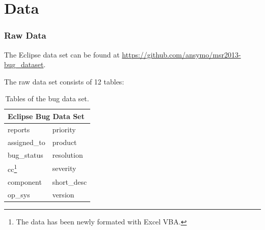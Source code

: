 \documentclass[xcolor=sgvnames,serifs,notes,compress,professionalfont]{beamer}
\begin{document}
\section{Data}
\begin{frame}
\frametitle{Raw Data}
The Eclipse data set can be found at
\url{https://github.com/ansymo/msr2013-bug_dataset}.

The raw data set consists of 12 tables:
\begin{table}
	\centering
	\begin{tabular}{|l|l|}
		\hline
		\multicolumn{2}{|l|}{Eclipse Bug Data Set}\\
		\hline
		reports & priority\\
		assigned\_to & product\\
		bug\_status & resolution\\
		cc\footnote{The data has been newly formated with Excel VBA.} & severity\\
		component & short\_desc\\
		op\_sys & version\\
		\hline 
	\end{tabular}
	\caption{Tables of the bug data set.}
	\label{tab:DataTables}
\end{table}	

\end{frame}
\end{document}

